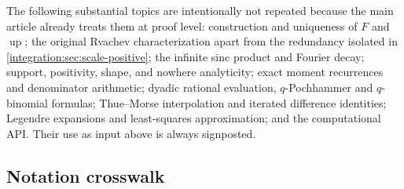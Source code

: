 \documentclass[11pt,oneside]{article}
\theoremstyle{definition}
\theoremstyle{remark}
\newcommand{\Up}{\operatorname{up}}
\begin{document}
The following substantial topics are intentionally not repeated because the main article
already treats them at proof level: construction and uniqueness of $F$ and $\Up$; the original
Rvachev characterization apart from the redundancy isolated in \cref{integration:sec:scale-positive}; the infinite sinc product and Fourier decay; support, positivity,
shape, and nowhere analyticity; exact moment recurrences and denominator arithmetic; dyadic
rational evaluation, $q$-Pochhammer and $q$-binomial formulas; Thue--Morse interpolation and
iterated difference identities; Legendre expansions and least-squares approximation; and the
computational API.  Their use as input above is always signposted.

\subsection{Notation crosswalk}
\label{integration:app:notation}
\end{document}
